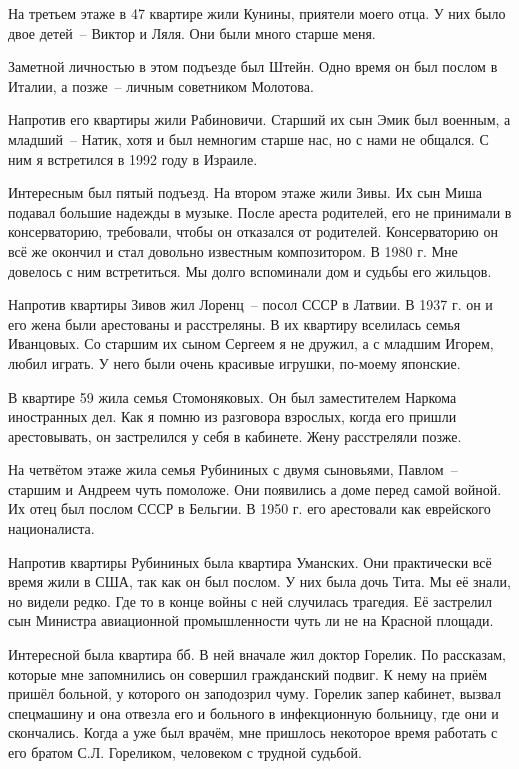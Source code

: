 На третьем этаже в 47 квартире жили Кунины, приятели моего отца. У них было двое детей~-- Виктор и Ляля. Они были много старше меня.

Заметной личностью в этом подъезде был Штейн. Одно время он был послом в Италии, а позже~-- личным советником Молотова.

Напротив его квартиры жили Рабиновичи. Старший их сын Эмик был военным, а младший~-- Натик, хотя и был немногим старше нас, но с нами не общался. С ним я встретился в 1992 году в Израиле.

Интересным был пятый подъезд. На втором этаже жили Зивы. Их сын Миша подавал большие надежды в музыке. После ареста родителей, его не принимали в консерваторию, требовали, чтобы он отказался от родителей. Консерваторию он всё же окончил и стал довольно известным композитором. В 1980 г. Мне довелось с ним встретиться. Мы долго вспоминали дом и судьбы его жильцов.

Напротив квартиры Зивов жил Лоренц~-- посол СССР в Латвии. В 1937 г. он и его жена были арестованы и расстреляны. В их квартиру вселилась семья Иванцовых. Со старшим их сыном Сергеем я не дружил, а с младшим Игорем, любил играть. У него были очень красивые игрушки, по-моему японские.

В квартире 59 жила семья Стомоняковых. Он был заместителем Наркома иностранных дел. Как я помню из разговора взрослых, когда его пришли арестовывать, он застрелился у себя в кабинете. Жену расстреляли позже.

На четвётом этаже жила семья Рубининых с двумя сыновьями, Павлом~-- старшим и Андреем чуть помоложе. Они появились а доме перед самой войной. Их отец был послом СССР в Бельгии. В 1950 г. его арестовали как еврейского националиста.

Напротив квартиры Рубининых была квартира Уманских. Они практически всё время жили в США, так как он был послом. У них была дочь Тита. Мы её знали, но видели редко. Где то в конце войны с ней случилась трагедия. Её застрелил сын Министра авиационной промышленности чуть ли не на Красной площади.

Интересной была квартира бб. В ней вначале жил доктор Горелик. По рассказам, которые мне запомнились он совершил гражданский подвиг. К нему на приём пришёл больной, у которого он заподозрил чуму. Горелик запер кабинет, вызвал спецмашину и она отвезла его и больного в инфекционную больницу, где они и скончались. Когда а уже был врачём, мне пришлось некоторое время работать с его братом С.Л. Гореликом, человеком с трудной судьбой.

